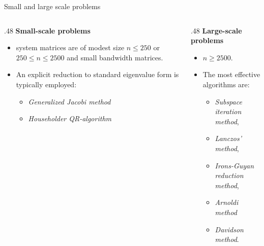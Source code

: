 \documentclass[aspectratio=169]{beamer}
\begin{document}
{\begin{frame}{Small and large scale problems}
  \begin{columns}[T]
    \begin{column}{.48\textwidth}
      \textbf{Small-scale problems}
      \begin{itemize}
        \item system matrices are of modest size $n\leq 250$ or $250\leq n \leq 2500$ and small bandwidth matrices.
        \item An explicit reduction to standard eigenvalue form is typically employed:
              \begin{itemize}
                \item\emph{Generalized Jacobi method}
                \item \emph{Householder QR-algorithm}
              \end{itemize}
      \end{itemize}
    \end{column}
    \begin{column}{.48\textwidth}
      \textbf{Large-scale problems}
      \begin{itemize}
        \item $n\geq 2500$.
        \item The most effective algorithms are:
              \begin{itemize}
                \item \emph{Subspace iteration method},
                \item \emph{Lanczos' method},
                \item \emph{Irons-Guyan reduction method},
                \item \emph{Arnoldi method}
                \item \emph{Davidson method}.
              \end{itemize}
      \end{itemize}
    \end{column}
  \end{columns}
\end{frame}

}
\end{document}
